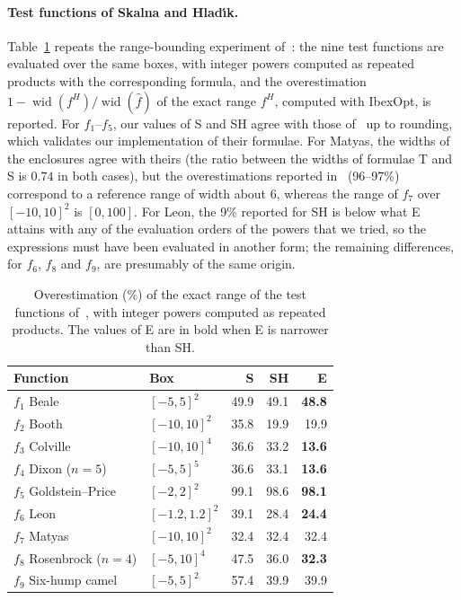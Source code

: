 \documentclass[11pt]{article}
\theoremstyle{definition}
\newcommand{\wid}{\operatorname{wid}}
\begin{document}
\paragraph{Test functions of Skalna and Hlad\'{\i}k.} Table~\ref{tab:sh} repeats the range-bounding experiment of~\cite[Table~3]{skalna2017new}: the nine test functions are evaluated over the same boxes, with integer powers computed as repeated products with the corresponding formula, and the overestimation $1-\wid(f^H)/\wid(\hat f)$ of the exact range $f^H$, computed with IbexOpt, is reported. For $f_1$--$f_5$, our values of S and SH agree with those of~\cite{skalna2017new} up to rounding, which validates our implementation of their formulae. For Matyas, the widths of the enclosures agree with theirs (the ratio between the widths of formulae T and S is $0.74$ in both cases), but the overestimations reported in~\cite{skalna2017new} (96--97\%) correspond to a reference range of width about 6, whereas the range of $f_7$ over $[-10,10]^2$ is $[0,100]$. For Leon, the 9\% reported for SH is below what E attains with any of the evaluation orders of the powers that we tried, so the expressions must have been evaluated in another form; the remaining differences, for $f_6$, $f_8$ and $f_9$, are presumably of the same origin.

\begin{table}[t]
\centering
\caption{Overestimation (\%) of the exact range of the test functions of~\cite{skalna2017new}, with integer powers computed as repeated products. The values of E are in bold when E is narrower than SH.}
\label{tab:sh}
\small
\begin{tabular}{llrrr}
\toprule
Function & Box & S & SH & E \\
\midrule
$f_1$ Beale & $[-5,5]^2$ & 49.9 & 49.1 & \textbf{48.8} \\
$f_2$ Booth & $[-10,10]^2$ & 35.8 & 19.9 & 19.9 \\
$f_3$ Colville & $[-10,10]^4$ & 36.6 & 33.2 & \textbf{13.6} \\
$f_4$ Dixon ($n=5$) & $[-5,5]^5$ & 36.6 & 33.1 & \textbf{13.6} \\
$f_5$ Goldstein--Price & $[-2,2]^2$ & 99.1 & 98.6 & \textbf{98.1} \\
$f_6$ Leon & $[-1.2,1.2]^2$ & 39.1 & 28.4 & \textbf{24.4} \\
$f_7$ Matyas & $[-10,10]^2$ & 32.4 & 32.4 & 32.4 \\
$f_8$ Rosenbrock ($n=4$) & $[-5,10]^4$ & 47.5 & 36.0 & \textbf{32.3} \\
$f_9$ Six-hump camel & $[-5,5]^2$ & 57.4 & 39.9 & 39.9 \\
\bottomrule
\end{tabular}
\end{table}
\end{document}
